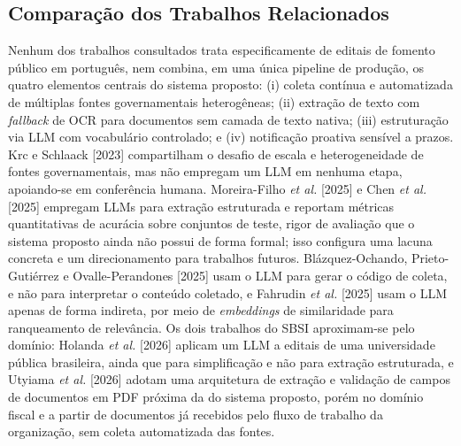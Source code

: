 \documentclass[12pt]{article}
\begin{document}
  \subsection{Comparação dos Trabalhos Relacionados}
  Nenhum dos trabalhos consultados trata especificamente de editais de fomento público em português, nem combina, em uma única pipeline de produção, os quatro elementos centrais do sistema proposto: (i) coleta contínua e automatizada de múltiplas fontes governamentais heterogêneas; (ii) extração de texto com \emph{fallback} de OCR para documentos sem camada de texto nativa; (iii) estruturação via LLM com vocabulário controlado; e (iv) notificação proativa sensível a prazos. Krc e Schlaack [2023] compartilham o desafio de escala e heterogeneidade de fontes governamentais, mas não empregam um LLM em nenhuma etapa, apoiando-se em conferência humana. Moreira-Filho \emph{et al.} [2025] e Chen \emph{et al.} [2025] empregam LLMs para extração estruturada e reportam métricas quantitativas de acurácia sobre conjuntos de teste, rigor de avaliação que o sistema proposto ainda não possui de forma formal; isso configura uma lacuna concreta e um direcionamento para trabalhos futuros. Blázquez-Ochando, Prieto-Gutiérrez e Ovalle-Perandones [2025] usam o LLM para gerar o código de coleta, e não para interpretar o conteúdo coletado, e Fahrudin \emph{et al.} [2025] usam o LLM apenas de forma indireta, por meio de \emph{embeddings} de similaridade para ranqueamento de relevância. Os dois trabalhos do SBSI aproximam-se pelo domínio: Holanda \emph{et al.} [2026] aplicam um LLM a editais de uma universidade pública brasileira, ainda que para simplificação e não para extração estruturada, e Utyiama \emph{et al.} [2026] adotam uma arquitetura de extração e validação de campos de documentos em PDF próxima da do sistema proposto, porém no domínio fiscal e a partir de documentos já recebidos pelo fluxo de trabalho da organização, sem coleta automatizada das fontes.

  
\end{document}
